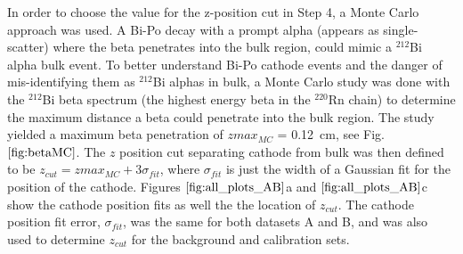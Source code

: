 In order to choose the value for the z-position cut in Step 4, a Monte Carlo approach was used. A Bi-Po decay with a prompt alpha (appears as single-scatter) where the beta penetrates into the bulk region, could mimic a $^{212}$Bi alpha bulk event. To better understand Bi-Po cathode events and the danger of mis-identifying them as $^{212}$Bi alphas in bulk, a Monte Carlo study was done with the $^{212}$Bi beta spectrum (the highest energy beta in the $^{220}$Rn chain) to determine the maximum distance a beta could penetrate into the bulk region. The study yielded a maximum beta penetration of $zmax_{MC}$ = 0.12~cm, see Fig. $\ref{fig:betaMC}$. 
The $z$ position cut separating cathode from bulk was then defined to be $z_{cut} = zmax_{MC} + 3\sigma_{fit}$, where $\sigma_{fit}$ is just the width of a Gaussian fit for the position of the cathode. Figures $\ref{fig:all_plots_AB}$a and $\ref{fig:all_plots_AB}$c show the cathode position fits as well the the location of $z_{cut}$. The cathode position fit error, $\sigma_{fit}$, was the same for both datasets A and B, and was also used to determine $z_{cut}$ for the background and calibration sets.

